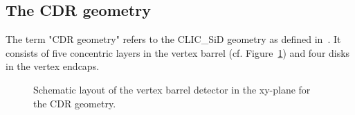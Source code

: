 \subsection{The CDR geometry}\label{sec:CLIC_SiD_CDR}
The term "CDR geometry" refers to the CLIC\_SiD geometry as defined in~\cite{CLICCDR2012}. It consists of five concentric layers in the vertex barrel (cf. Figure~\ref{fig:vertex_barrel}) and four disks in the vertex endcaps. 

\begin{figure}[H]
  \centering
  \label{fig:vertex_barrel_b}
  \caption{Schematic layout of the vertex barrel detector in the xy-plane for the CDR geometry.}\label{fig:vertex_barrel}
\end{figure}


